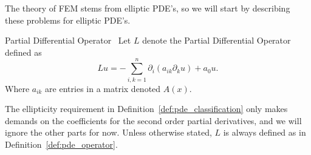 The theory of FEM stems from elliptic PDE's, so we will start by
describing these problems for elliptic PDE's.
\begin{defn}{Partial Differential Operator}~\label{def:pde_operator}
    Let $L$ denote the Partial Differential Operator defined as
    \begin{equation}
        Lu = - \sum_{i,k=1}^n \partial_i(a_{ik} \partial_k u)+ a_0u.
    \end{equation}
    Where $a_{ik}$ are entries in a matrix denoted $A(x)$.
\end{defn}
The ellipticity requirement in Definition~\ref{def:pde_classification} only 
makes demands on the coefficients for the second order partial derivatives, 
and we will ignore the other parts for now. Unless otherwise stated, $L$ is 
always defined as in Definition~\ref{def:pde_operator}.
